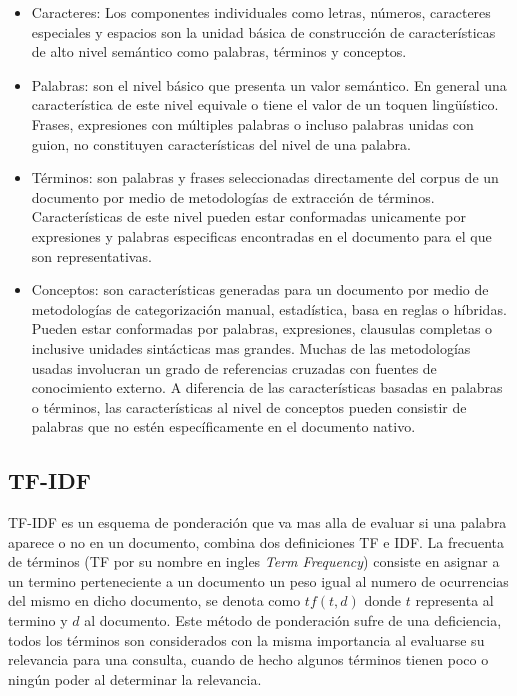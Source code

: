     \begin{itemize}
    \item Caracteres: Los componentes individuales como letras, números, caracteres especiales y espacios son la unidad básica de construcción de características de alto nivel semántico como palabras, términos y conceptos.\cite{tmhandbook}

    \item Palabras: son el nivel básico que presenta un valor semántico. En general una característica de este nivel equivale o tiene el valor de un toquen lingüístico.  Frases, expresiones con múltiples palabras o incluso palabras unidas con guion, no constituyen características del nivel de una palabra.\cite{tmhandbook}
    \item Términos: son palabras y frases seleccionadas directamente del corpus de un documento por medio de metodologías de extracción de términos. Características de este nivel pueden estar conformadas unicamente por expresiones y palabras especificas encontradas en el documento para el que son representativas.\cite{tmhandbook}

    \item Conceptos: son características generadas para un documento por medio de metodologías de categorización manual, estadística, basa en reglas o híbridas. Pueden estar conformadas por palabras, expresiones, clausulas completas o inclusive unidades sintácticas mas grandes. Muchas de las metodologías usadas involucran un grado de referencias cruzadas con fuentes de conocimiento externo. A diferencia de las características basadas en palabras o términos, las características al nivel de conceptos pueden consistir de palabras que no estén específicamente en el documento nativo.\cite{tmhandbook}
    \end{itemize}

\subsection{TF-IDF}
  TF-IDF es un esquema de ponderación que va mas alla de evaluar si una palabra aparece o no en un documento, combina dos definiciones TF e IDF. 
  La frecuenta de términos (TF por su nombre en ingles \textit{Term Frequency}) consiste en asignar a un termino perteneciente a un documento un peso igual al numero de ocurrencias del mismo en dicho documento, se denota como $tf(t,d)$  donde $t$ representa al termino y $d$ al documento. Este método de ponderación sufre de una deficiencia, todos los términos son considerados con la misma importancia al evaluarse su relevancia para una consulta, cuando de hecho algunos términos tienen poco o ningún poder al determinar la relevancia. \cite{informationretrieval}

